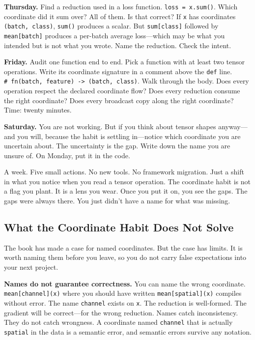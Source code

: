 \documentclass[11pt,titlepage]{article}
\begin{document}
\textbf{Thursday.} Find a reduction used in a loss function.
\texttt{loss\ =\ x.sum()}. Which coordinate did it sum over? All of
them. Is that correct? If \texttt{x} has coordinates
\texttt{(batch,\ class)}, \texttt{sum()} produces a scalar. But
\texttt{sum{[}class{]}} followed by \texttt{mean{[}batch{]}} produces a
per-batch average loss---which may be what you intended but is not what
you wrote. Name the reduction. Check the intent.

\textbf{Friday.} Audit one function end to end. Pick a function with at
least two tensor operations. Write its coordinate signature in a comment
above the \texttt{def} line.
\texttt{\#\ fn(batch,\ feature)\ -\textgreater{}\ (batch,\ class)}. Walk
through the body. Does every operation respect the declared coordinate
flow? Does every reduction consume the right coordinate? Does every
broadcast copy along the right coordinate? Time: twenty minutes.

\textbf{Saturday.} You are not working. But if you think about tensor
shapes anyway---and you will, because the habit is settling in---notice
which coordinate you are uncertain about. The uncertainty is the gap.
Write down the name you are unsure of. On Monday, put it in the code.

A week. Five small actions. No new tools. No framework migration. Just a
shift in what you notice when you read a tensor operation. The
coordinate habit is not a flag you plant. It is a lens you wear. Once
you put it on, you see the gaps. The gaps were always there. You just
didn't have a name for what was missing.

\vspace{2em}

\hypertarget{what-the-coordinate-habit-does-not-solve}{%
\subsection{What the Coordinate Habit Does Not
Solve}\label{what-the-coordinate-habit-does-not-solve}}

The book has made a case for named coordinates. But the case has limits.
It is worth naming them before you leave, so you do not carry false
expectations into your next project.

\textbf{Names do not guarantee correctness.} You can name the wrong
coordinate. \texttt{mean{[}channel{]}(x)} where you should have written
\texttt{mean{[}spatial{]}(x)} compiles without error. The name
\texttt{channel} exists on \texttt{x}. The reduction is well-formed. The
gradient will be correct---for the wrong reduction. Names catch
inconsistency. They do not catch wrongness. A coordinate named
\texttt{channel} that is actually \texttt{spatial} in the data is a
semantic error, and semantic errors survive any notation.
\end{document}
